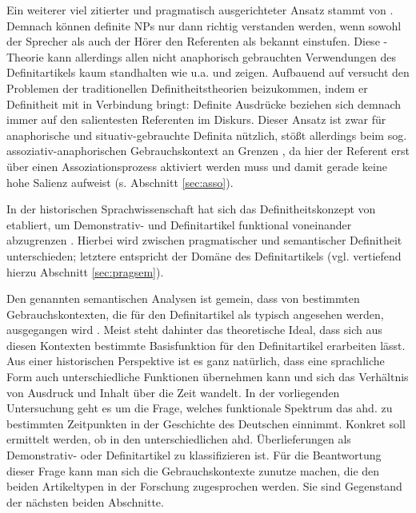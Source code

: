Ein weiterer viel zitierter und pragmatisch ausgerichteter Ansatz stammt von \textcite{Christophersen1939}. Demnach können definite NPs nur dann richtig verstanden werden, wenn sowohl der Sprecher als auch der Hörer den Referenten als bekannt einstufen. Diese -Theorie kann allerdings allen nicht anaphorisch gebrauchten Verwendungen des Definitartikels kaum standhalten wie u.a. \textcite{Hawkins1978} und \textcite{Lobner1985} zeigen. Aufbauend auf \textcite{Lewis1970} versucht \textcite{vonHeusinger1996} den Problemen der traditionellen Definitheitstheorien beizukommen, indem er Definitheit mit  in Verbindung bringt: Definite Ausdrücke beziehen sich demnach immer auf den salientesten Referenten im Diskurs. Dieser Ansatz ist zwar für anaphorische und situativ-gebrauchte Definita nützlich, stößt allerdings beim sog. assoziativ-anaphorischen Gebrauchskontext an Grenzen \parencite[s. auch][144-149]{Cui2014}, da hier der Referent erst über einen Assoziationsprozess aktiviert werden muss und damit gerade keine hohe Salienz aufweist (s. Abschnitt \ref{sec:asso}).

In der historischen Sprachwissenschaft hat sich das Definitheitskonzept von \textcite{Lobner1985} etabliert, um Demonstrativ- und Definitartikel funktional voneinander abzugrenzen \parencite{Demske2001,Szczepaniak2011a,Schlachter2015}. Hierbei wird zwischen pragmatischer und semantischer Definitheit unterschieden; letztere entspricht der Domäne des Definitartikels (vgl. vertiefend hierzu Abschnitt \ref{sec:pragsem}). 

Den genannten  semantischen Analysen ist gemein, dass von bestimmten Gebrauchskontexten, die für den Definitartikel als typisch angesehen werden, ausgegangen wird \parencite[9]{Cui2014}. Meist steht dahinter das theoretische Ideal, dass sich aus diesen Kontexten  bestimmte Basisfunktion für den Definitartikel erarbeiten lässt. Aus einer historischen Perspektive ist es ganz natürlich, dass eine sprachliche Form auch unterschiedliche Funktionen übernehmen kann und sich das Verhältnis von Ausdruck und Inhalt über die Zeit wandelt. In der vorliegenden Untersuchung geht es um die Frage, welches funktionale Spektrum das ahd.  zu bestimmten Zeitpunkten in der Geschichte des Deutschen einnimmt. Konkret soll ermittelt werden, ob  in den unterschiedlichen ahd. Überlieferungen als Demonstrativ- oder Definitartikel zu klassifizieren ist. Für die Beantwortung dieser Frage kann man sich die Gebrauchskontexte zunutze machen, die den beiden Artikeltypen in der Forschung zugesprochen werden. Sie sind Gegenstand der nächsten beiden Abschnitte. 


